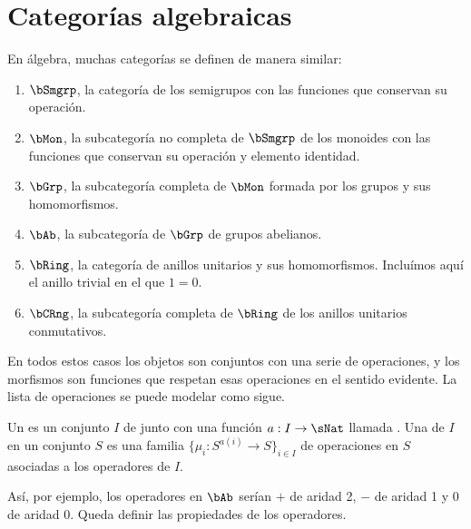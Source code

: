 \section{Categorías algebraicas}

\begin{example}\label{ex:variety}
  En álgebra, muchas categorías se definen de manera similar:
  \begin{enumerate}
  \item $\bSmgrp$, la categoría de los semigrupos con las funciones que
    conservan su operación.
  \item $\bMon$, la subcategoría no completa de $\bSmgrp$ de los monoides con
    las funciones que conservan su operación y elemento identidad.
  \item $\bGrp$, la subcategoría completa de $\bMon$ formada por los grupos y
    sus homomorfismos.
  \item $\bAb$, la subcategoría de $\bGrp$ de grupos abelianos.
  \item $\bRing$, la categoría de anillos unitarios y sus homomorfismos.
    Incluímos aquí el anillo trivial en el que $1=0$.
  \item $\bCRng$, la subcategoría completa de $\bRing$ de los anillos unitarios
    conmutativos.
  \end{enumerate}
\end{example}

En todos estos casos los objetos son conjuntos con una serie de
operaciones, y los morfismos son funciones que respetan esas
operaciones en el sentido evidente. La lista de operaciones se puede
modelar como sigue.\cite[p. 120]{maclane}

\begin{definition}
  Un  es un conjunto $I$ de  junto con
  una función $a:I\to\sNat$ llamada .  Una  de $I$ en
  un conjunto $S$ es una familia $\{\mu_i : S^{a(i)} \to S\}_{i\in I}$ de
  operaciones en $S$ asociadas a los operadores de $I$.
\end{definition}

Así, por ejemplo, los operadores en $\bAb$ serían $+$ de aridad 2, $-$
de aridad 1 y $0$ de aridad 0. Queda definir las propiedades de los
operadores.
    
